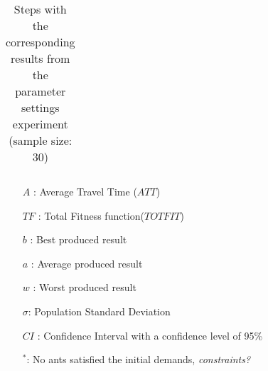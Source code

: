 \begin{sidewaystable}
\begin{tabular}{|l|l|l|l|l|l||c|c|c|c|c|c|c|}
    \hline
    \end{tabular}
    \caption {Steps with the corresponding results from the parameter settings experiment (sample size: 30)}
    \tiny
    \begin{itemize}[noitemsep]
    \item[$A$ :] Average Travel Time ($ATT$)
    \item[$TF$ :] Total Fitness function($TOTFIT$)
    \item[$b$ :] Best produced result
    \item[$a$ :] Average produced result
    \item[$w$ :] Worst produced result
    \item[$\sigma$:] Population Standard Deviation 
    \item[$CI$ :] Confidence Interval with a confidence level of 95\%
    \item[$^*$:] No ants satisfied the initial demands, \emph{\color{blue} constraints?}
    \end{itemize}
    \label{table:pm1}
\end{sidewaystable}


